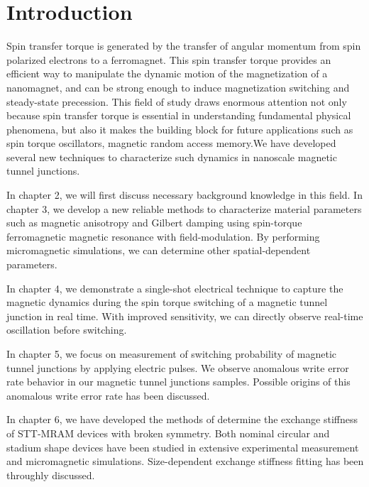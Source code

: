 \chapter{Introduction}

  Spin transfer torque is generated by the transfer of angular momentum from spin polarized electrons to a ferromagnet. This spin transfer torque provides an efficient way to manipulate the dynamic motion of the magnetization of a nanomagnet, and can be strong enough to induce magnetization switching and steady-state precession. This field of study draws enormous attention not only because spin transfer torque is essential in understanding fundamental physical phenomena, but also it makes the building block for future applications such as spin torque oscillators, magnetic random access memory.We have developed several new techniques to characterize such dynamics in nanoscale magnetic tunnel junctions.
  
  In chapter 2, we will first discuss necessary background  knowledge in this field. In chapter 3, we develop a new reliable methods to characterize material parameters such as magnetic anisotropy and Gilbert damping using spin-torque ferromagnetic magnetic resonance with field-modulation. By performing micromagnetic simulations, we can determine other spatial-dependent parameters.
  
  In chapter 4, we demonstrate a single-shot electrical technique to capture the magnetic dynamics during the spin torque switching of a magnetic tunnel junction in real time. With improved sensitivity, we can directly observe real-time oscillation before switching.
  
  In chapter 5, we focus on measurement of switching probability of magnetic tunnel junctions by applying electric pulses. We observe anomalous write error rate behavior in our magnetic tunnel junctions samples. Possible origins of this anomalous write error rate has been discussed.
  
  In chapter 6, we have developed the methods of determine the exchange stiffness of STT-MRAM devices with broken symmetry. Both nominal circular and stadium shape devices have been studied in extensive experimental measurement and micromagnetic simulations. Size-dependent exchange stiffness fitting has been throughly discussed.


